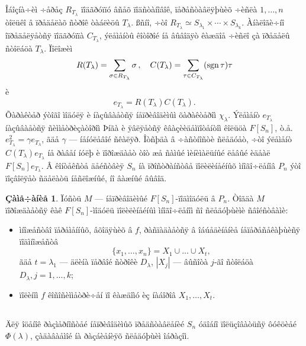\documentclass{article}
\numberwithin{equation}{section}
\theoremstyle{plain}
\theoremstyle{definition}
\newtheorem{remark}{Çàìå÷àíèå}
\begin{document}
\begin{fulltext}
Îáîçíà÷èì ÷åðåç $R_{T_\lambda}$ ïîäãðóïïó âñåõ ïîäñòàíîâîê, ïåðåñòàâëÿþùèõ ÷èñëà
$1,\ldots, n$ òîëüêî â ïðåäåëàõ ñòðîê òàáëèöû $T_\lambda$. ßñíî, ÷òî
$R_{T_\lambda}\simeq S_{\lambda_1}\times\cdots\times S_{\lambda_k}$. Àíàëîãè÷íî
îïðåäåëÿåòñÿ ïîäãðóïïà $C_{T_\lambda}$, ýëåìåíòû êîòîðîé íå âûâîäÿò êàæäîå ÷èñëî çà 
ïðåäåëû ñòîëáöà $T_\lambda$. Ïîëîæèì
$$
R(T_\lambda)=\sum_{\sigma\in R_{T_\lambda}} \sigma\, ,\quad
C(T_\lambda)=\sum_{\tau\in C_{T_\lambda}}({\rm sgn}\,\tau)\tau
$$
è
$$
e_{T_\lambda}= R(T_\lambda) C(T_\lambda).
$$
Õàðàêòåð ýòîãî ìîäóëÿ è íàçûâàåòñÿ íåïðèâîäèìûì õàðàêòåðîì $\chi_\lambda$. Ýëåìåíò 
$e_{T_\lambda}$ íàçûâàåòñÿ ñèììåòðèçàòîðîì Þíãà è ÿâëÿåòñÿ êâàçèèäåìïîòåíòîì êîëüöà
$F[S_n]$, ò.å. $e_{T_\lambda}^2=\gamma e_{T_\lambda}$, ãäå $\gamma$ --- íåíóëåâîé 
ñêàëÿð. Îòñþäà â ÷àñòíîñòè ñëåäóåò, ÷òî ýëåìåíò $C(T_\lambda)e_{T_\lambda}$ íå ðàâåí 
íóëþ è ïîðîæäàåò òîò æå ñàìûé ìèíèìàëüíûé ëåâûé èäåàë $F[S_n]e_{T_\lambda}$. Â
êîíòåêñòå äåéñòâèÿ $S_n$ íà ïðîñòðàíñòâå ïîëèëèíåéíûõ ìíîãî÷ëåíîâ $P_n$ ýòî
ïîçâîëÿåò ñäåëàòü íåñëîæíûé, íî âàæíûé âûâîä.
\begin{remark}\label{r1}
Ïóñòü $M$ --- íåïðèâîäèìûé $F[S_n]$-ïîäìîäóëü â $P_n$. Òîãäà $M$ ïîðîæäàåòñÿ êàê
$F[S_n]$-ìîäóëü ïîëèëèíåéíûì ìíîãî÷ëåíîì ñî ñëåäóþùèìè ñâîéñòâàìè:
\begin{itemize}
\item
ìíîæåñòâî ïåðåìåííûõ, âõîäÿùèõ â $f$, ðàñïàäàåòñÿ â îáúåäèíåíèå íåïåðåñåêàþùèñÿ
ïîäìíîæåñòâ
$$
\{x_1,\ldots,x_n\}=X_1\cup\ldots\cup X_t,
$$
ãäå $t=\lambda_1$ --- äëèíà ïåðâîé ñòðîêè $D_\lambda$, $|X_j|$ --- âûñîòà $j$-ãî ñòîëáöà
$D_\lambda, j=1,\ldots,k$;
\item
ïîëèíîì $f$ êîñîñèììåòðè÷åí ïî êàæäîìó èç íàáîðîâ $X_1,\ldots, X_t$.
\end{itemize}
\end{remark}

\subsection{}\label{s2.3}
Äëÿ îöåíîê ðàçìåðíîñòåé íåïðèâîäèìûõ ïðåäñòàâëåíèé $S_n$ óäîáíî ïîëüçîâàòüñÿ ôóêöèåé
$\Phi(\lambda)$, çàäàâàåìîé íà ðàçáèåíèÿõ ñëåäóþùèì îáðàçîì.


\end{fulltext}
\end{document}

